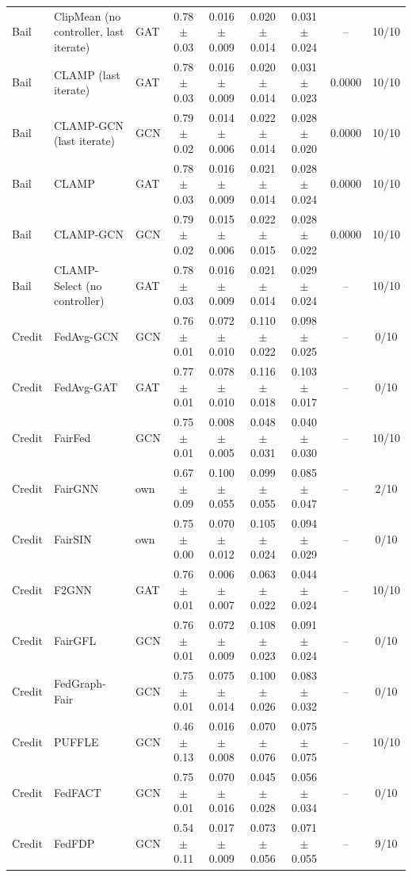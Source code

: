 \begin{longtable}{lp{3.2cm}lcccccc}
Bail & ClipMean (no controller, last iterate) & GAT & 0.78$\pm$0.03 & 0.016$\pm$0.009 & 0.020$\pm$0.014 & 0.031$\pm$0.024 & -- & 10/10 \\
Bail & CLAMP (last iterate) & GAT & 0.78$\pm$0.03 & 0.016$\pm$0.009 & 0.020$\pm$0.014 & 0.031$\pm$0.023 & 0.0000 & 10/10 \\
Bail & CLAMP-GCN (last iterate) & GCN & 0.79$\pm$0.02 & 0.014$\pm$0.006 & 0.022$\pm$0.014 & 0.028$\pm$0.020 & 0.0000 & 10/10 \\
Bail & CLAMP & GAT & 0.78$\pm$0.03 & 0.016$\pm$0.009 & 0.021$\pm$0.014 & 0.028$\pm$0.024 & 0.0000 & 10/10 \\
Bail & CLAMP-GCN & GCN & 0.79$\pm$0.02 & 0.015$\pm$0.006 & 0.022$\pm$0.015 & 0.028$\pm$0.022 & 0.0000 & 10/10 \\
Bail & CLAMP-Select (no controller) & GAT & 0.78$\pm$0.03 & 0.016$\pm$0.009 & 0.021$\pm$0.014 & 0.029$\pm$0.024 & -- & 10/10 \\
Credit & FedAvg-GCN & GCN & 0.76$\pm$0.01 & 0.072$\pm$0.010 & 0.110$\pm$0.022 & 0.098$\pm$0.025 & -- & 0/10 \\
Credit & FedAvg-GAT & GAT & 0.77$\pm$0.01 & 0.078$\pm$0.010 & 0.116$\pm$0.018 & 0.103$\pm$0.017 & -- & 0/10 \\
Credit & FairFed & GCN & 0.75$\pm$0.01 & 0.008$\pm$0.005 & 0.048$\pm$0.031 & 0.040$\pm$0.030 & -- & 10/10 \\
Credit & FairGNN & own & 0.67$\pm$0.09 & 0.100$\pm$0.055 & 0.099$\pm$0.055 & 0.085$\pm$0.047 & -- & 2/10 \\
Credit & FairSIN & own & 0.75$\pm$0.00 & 0.070$\pm$0.012 & 0.105$\pm$0.024 & 0.094$\pm$0.029 & -- & 0/10 \\
Credit & F2GNN & GAT & 0.76$\pm$0.01 & 0.006$\pm$0.007 & 0.063$\pm$0.022 & 0.044$\pm$0.024 & -- & 10/10 \\
Credit & FairGFL & GCN & 0.76$\pm$0.01 & 0.072$\pm$0.009 & 0.108$\pm$0.023 & 0.091$\pm$0.024 & -- & 0/10 \\
Credit & FedGraph-Fair & GCN & 0.75$\pm$0.01 & 0.075$\pm$0.014 & 0.100$\pm$0.026 & 0.083$\pm$0.032 & -- & 0/10 \\
Credit & PUFFLE & GCN & 0.46$\pm$0.13 & 0.016$\pm$0.008 & 0.070$\pm$0.076 & 0.075$\pm$0.075 & -- & 10/10 \\
Credit & FedFACT & GCN & 0.75$\pm$0.01 & 0.070$\pm$0.016 & 0.045$\pm$0.028 & 0.056$\pm$0.034 & -- & 0/10 \\
Credit & FedFDP & GCN & 0.54$\pm$0.11 & 0.017$\pm$0.009 & 0.073$\pm$0.056 & 0.071$\pm$0.055 & -- & 9/10 \\

\end{longtable}
